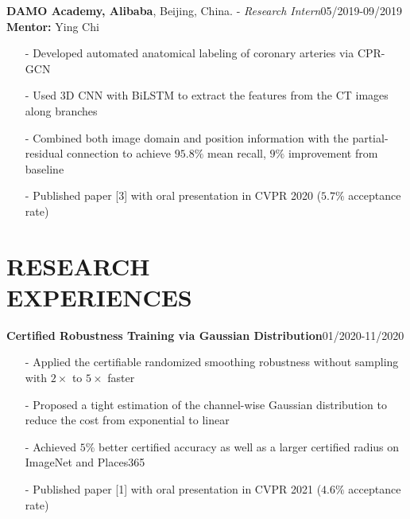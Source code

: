 \documentclass[margin]{res}
\begin{document}
\begin{resume}
                \vspace{-1em}  
                
                \textbf{DAMO Academy, Alibaba}, Beijing, China. - {\it Research Intern}\hfill 05/2019-09/2019\\
                \textbf{Mentor:} Ying Chi
                \begin{itemize}\itemsep -2.2pt %
                 \item[-] Developed automated anatomical labeling of coronary arteries via CPR-GCN
                 \item[-] Used 3D CNN with BiLSTM to extract the features from the CT images along branches
                 \item[-] Combined both image domain and position information with the partial-residual connection to achieve $95.8\%$ mean recall, $9\%$ improvement from baseline
                 \item[-] Published paper [3] with oral presentation in CVPR 2020 ($5.7\%$ acceptance rate)
                 \end{itemize}

\vspace{-1em}
\section{RESEARCH \\ EXPERIENCES}
                \textbf{Certified Robustness Training via Gaussian Distribution}\hfill 01/2020-11/2020
                \begin{itemize}\itemsep -2.2pt %
                 \item[-] Applied the certifiable randomized smoothing robustness without sampling with $2\times$ to $5\times$ faster
                 \item[-] Proposed a tight estimation of the channel-wise Gaussian distribution to reduce the cost from exponential to linear
                 \item[-] Achieved $5\%$ better certified accuracy as well as a larger certified radius on ImageNet and Places365
                 \item[-] Published paper [1] with oral presentation in CVPR 2021 ($4.6\%$ acceptance rate)
                 \end{itemize}


\end{resume}
\end{document}
